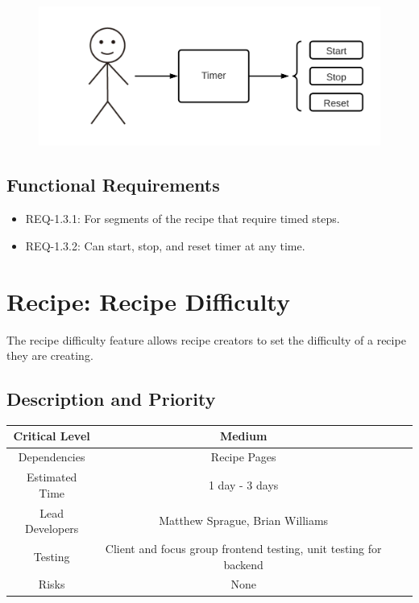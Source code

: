 \documentclass{scrreprt}
\begin{document}
\begin{figure}[H]\centering
    \includegraphics[width=\columnwidth]{FlowCharts/Recipe-Timer.png}
\end{figure}

\subsection{Functional Requirements}

\begin{itemize}
    \item REQ-1.3.1: For segments of the recipe that require timed steps.
    \item REQ-1.3.2: Can start, stop, and reset timer at any time.
\end{itemize}

\section{Recipe: Recipe Difficulty}

The recipe difficulty feature allows recipe creators to set the difficulty of a recipe they are creating.

\subsection{Description and Priority}
\begin{center}
    \begin{tabular}{| c | c | c | c |}
        \hline
        Critical Level  & Medium                                                            \\
        \hline
        Dependencies    & Recipe Pages                                                      \\
        \hline
        Estimated Time  & 1 day - 3 days                                                    \\
        \hline
        Lead Developers & Matthew Sprague, Brian Williams                                   \\
        \hline
        Testing         & Client and focus group frontend testing, unit testing for backend \\
        \hline
        Risks           & None                                                              \\
        \hline
    \end{tabular}
\end{center}
\end{document}
